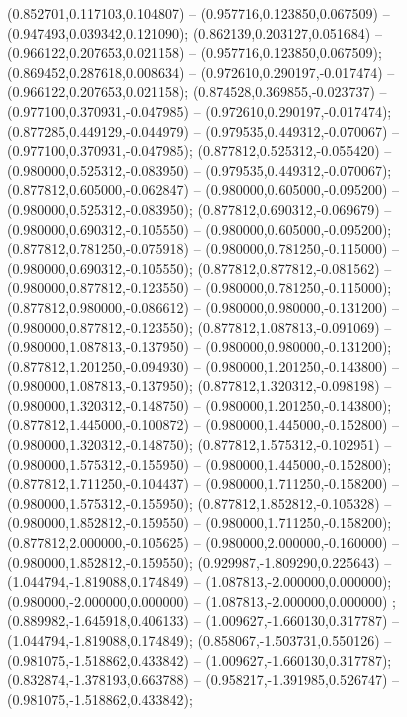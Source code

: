  (0.852701,0.117103,0.104807) -- (0.957716,0.123850,0.067509) -- (0.947493,0.039342,0.121090);
 (0.862139,0.203127,0.051684) -- (0.966122,0.207653,0.021158) -- (0.957716,0.123850,0.067509);
 (0.869452,0.287618,0.008634) -- (0.972610,0.290197,-0.017474) -- (0.966122,0.207653,0.021158);
 (0.874528,0.369855,-0.023737) -- (0.977100,0.370931,-0.047985) -- (0.972610,0.290197,-0.017474);
 (0.877285,0.449129,-0.044979) -- (0.979535,0.449312,-0.070067) -- (0.977100,0.370931,-0.047985);
 (0.877812,0.525312,-0.055420) -- (0.980000,0.525312,-0.083950) -- (0.979535,0.449312,-0.070067);
 (0.877812,0.605000,-0.062847) -- (0.980000,0.605000,-0.095200) -- (0.980000,0.525312,-0.083950);
 (0.877812,0.690312,-0.069679) -- (0.980000,0.690312,-0.105550) -- (0.980000,0.605000,-0.095200);
 (0.877812,0.781250,-0.075918) -- (0.980000,0.781250,-0.115000) -- (0.980000,0.690312,-0.105550);
 (0.877812,0.877812,-0.081562) -- (0.980000,0.877812,-0.123550) -- (0.980000,0.781250,-0.115000);
 (0.877812,0.980000,-0.086612) -- (0.980000,0.980000,-0.131200) -- (0.980000,0.877812,-0.123550);
 (0.877812,1.087813,-0.091069) -- (0.980000,1.087813,-0.137950) -- (0.980000,0.980000,-0.131200);
 (0.877812,1.201250,-0.094930) -- (0.980000,1.201250,-0.143800) -- (0.980000,1.087813,-0.137950);
 (0.877812,1.320312,-0.098198) -- (0.980000,1.320312,-0.148750) -- (0.980000,1.201250,-0.143800);
 (0.877812,1.445000,-0.100872) -- (0.980000,1.445000,-0.152800) -- (0.980000,1.320312,-0.148750);
 (0.877812,1.575312,-0.102951) -- (0.980000,1.575312,-0.155950) -- (0.980000,1.445000,-0.152800);
 (0.877812,1.711250,-0.104437) -- (0.980000,1.711250,-0.158200) -- (0.980000,1.575312,-0.155950);
 (0.877812,1.852812,-0.105328) -- (0.980000,1.852812,-0.159550) -- (0.980000,1.711250,-0.158200);
 (0.877812,2.000000,-0.105625) -- (0.980000,2.000000,-0.160000) -- (0.980000,1.852812,-0.159550);
 (0.929987,-1.809290,0.225643) -- (1.044794,-1.819088,0.174849) -- (1.087813,-2.000000,0.000000);
 (0.980000,-2.000000,0.000000) -- (1.087813,-2.000000,0.000000) ;
 (0.889982,-1.645918,0.406133) -- (1.009627,-1.660130,0.317787) -- (1.044794,-1.819088,0.174849);
 (0.858067,-1.503731,0.550126) -- (0.981075,-1.518862,0.433842) -- (1.009627,-1.660130,0.317787);
 (0.832874,-1.378193,0.663788) -- (0.958217,-1.391985,0.526747) -- (0.981075,-1.518862,0.433842);
